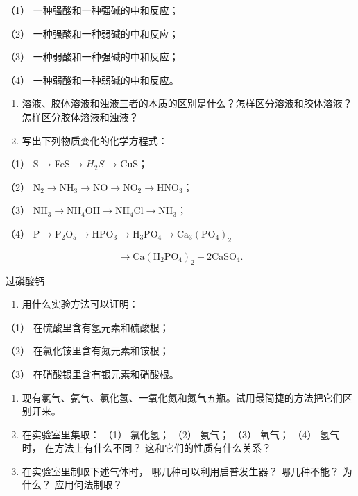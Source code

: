 （1） 一种强酸和一种强碱的中和反应；

（2） 一种强酸和一种弱碱的中和反应；

（3） 一种弱酸和一种强碱的中和反应；

（4） 一种弱酸和一种弱碱的中和反应。

\begin{enumerate}[start=15]
\item
  溶液、胶体溶液和浊液三者的本质的区别是什么？怎样区分溶液和胶体溶液？怎样区分胶体溶液和浊液？
\item
  写出下列物质变化的化学方程式：
\end{enumerate}

（1） S → FeS → \(H_{2}S\) → CuS；

（2）
\(\mathrm{N}_{2} \longrightarrow \mathrm{NH}_{3} \longrightarrow \mathrm{NO} \longrightarrow \mathrm{NO}_{2} \longrightarrow \mathrm{HNO}_{3}\)；

（3）
\(\mathrm{NH}_{3} \longrightarrow \mathrm{NH}_{4} \mathrm{OH} \longrightarrow \mathrm{NH}_{4} \mathrm{Cl} \longrightarrow \mathrm{NH}_{3}\)；

（4）
\(\mathrm{P} \longrightarrow \mathrm{P}_{2} \mathrm{O}_{5} \longrightarrow \mathrm{HPO}_{3} \longrightarrow \mathrm{H}_{3} \mathrm{PO}_{4} \longrightarrow \mathrm{Ca}_{3}(\mathrm{PO}_{4})_{2}\)

\[
\longrightarrow \mathrm{Ca} (\mathrm{H} _ {2} \mathrm{PO} _ {4}) _ {2} + 2 \mathrm{CaSO} _ {4}.
\]

过磷酸钙

\begin{enumerate}[start=17]
\item
  用什么实验方法可以证明：
\end{enumerate}

（1） 在硫酸里含有氢元素和硫酸根；

（2） 在氯化铵里含有氮元素和铵根；

（3） 在硝酸银里含有银元素和硝酸根。

\begin{enumerate}[start=18]
\item
  现有氯气、氨气、氯化氢、一氧化氮和氮气五瓶。试用最简捷的方法把它们区别开来。
\item
  在实验室里集取： （1） 氯化氢； （2） 氨气； （3） 氧气； （4）
  氢气时， 在方法上有什么不同？ 这和它们的性质有什么关系？
\item
  在实验室里制取下述气体时， 哪几种可以利用启普发生器？ 哪几种不能？
  为什么？ 应用何法制取？
\end{enumerate}

